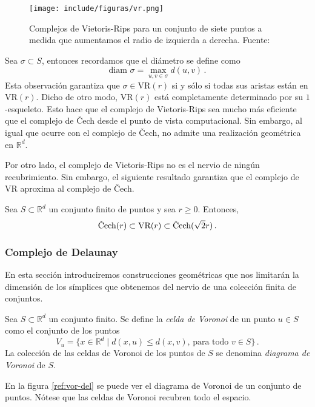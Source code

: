 \begin{figure}[!ht]
\centering
\texttt{[image: include/figuras/vr.png]} 
\caption{Complejos de Vietoris-Rips para un conjunto de siete puntos a medida que aumentamos el radio de izquierda a derecha. Fuente: \cite{Ulmer2019}}
\label{ref:vr}
\end{figure}


Sea $\sigma \subset S$, entonces recordamos que el diámetro se define como
\[\textrm{diam } \sigma = \max_{u, v \in \sigma} d(u,v)\,.\]
Esta observación garantiza que $\sigma \in \text{VR}(r)$ si y sólo si todas sus aristas están en $\text{VR}(r)$. Dicho de otro modo, $\text{VR}(r)$ está completamente determinado por su $1$-esqueleto. Esto hace que el complejo de Vietoris-Rips sea mucho más eficiente que el complejo de \v{C}ech desde el punto de vista computacional. Sin embargo, al igual que ocurre con el complejo de \v{C}ech, no admite una realización geométrica en $\mathbb{R}^d$.

Por otro lado, el complejo de Vietoris-Rips no es el nervio de ningún recubrimiento. Sin embargo, el siguiente resultado garantiza que el complejo de VR aproxima al complejo de \v{C}ech.

\begin{lemma}
\label{ref:lemaVR}
Sea $S \subset \mathbb{R}^d$ un conjunto finito de puntos y sea $r \geq 0$. Entonces,
\[
\text{\rm \v{C}ech}(r) \subset \text{\rm VR}(r) \subset \text{\rm \v{C}ech}(\sqrt{2}r)\,.
\]
\end{lemma}

\subsubsection*{Complejo de Delaunay}
En esta sección introduciremos construcciones geométricas que nos limitarán la dimensión de los símplices que obtenemos del nervio de una colección finita de conjuntos.

\begin{definition}
Sea $S \subset \mathbb{R}^d$ un conjunto finito. Se define la \emph{celda de Voronoi} de un punto $u \in S$ como el conjunto de los puntos
\[
V_u = \{ x \in \mathbb{R}^d \mid d(x,u) \leq d(x,v) \text{, para todo } v \in S\}\,.
\]
La colección de las celdas de Voronoi de los puntos de $S$ se denomina \emph{diagrama de Voronoi} de $S$.
\end{definition}

En la figura \ref{ref:vor-del} se puede ver el diagrama de Voronoi de un conjunto de puntos. Nótese que las celdas de Voronoi recubren todo el espacio.

